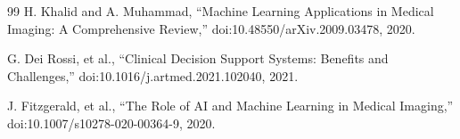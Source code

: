 \documentclass[12pt]{article}
\begin{document}
\begin{flushleft}
\begin{thebibliography}{99}
H. Khalid and A. Muhammad, ``Machine Learning Applications in Medical Imaging: A Comprehensive Review,'' 
doi:10.48550/arXiv.2009.03478, 2020.

G. Dei Rossi, et al., ``Clinical Decision Support Systems: Benefits and Challenges,'' 
doi:10.1016/j.artmed.2021.102040, 2021.

J. Fitzgerald, et al., ``The Role of AI and Machine Learning in Medical Imaging,'' 
doi:10.1007/s10278-020-00364-9, 2020.

\end{thebibliography}

\end{flushleft}
\end{document}
